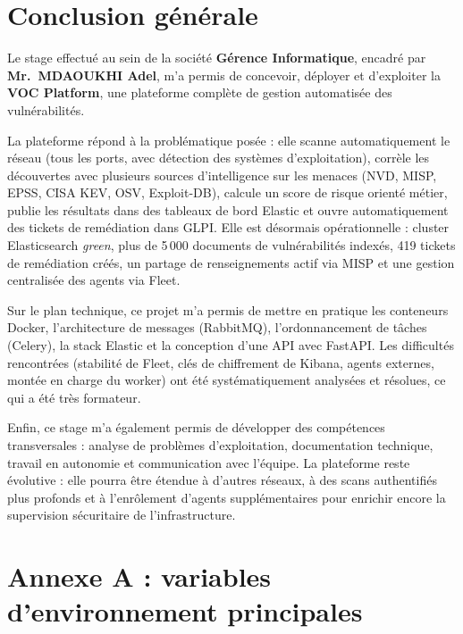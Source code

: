 \documentclass[11pt,a4paper]{article}
\begin{document}
\section{Conclusion g\'en\'erale}

Le stage effectu\'e au sein de la soci\'et\'e \textbf{G\'erence Informatique},
encadr\'e par \textbf{Mr.~MDAOUKHI Adel}, m'a permis de concevoir, d\'eployer
et d'exploiter la \textbf{VOC Platform}, une plateforme compl\`ete de gestion
automatis\'ee des vuln\'erabilit\'es.

La plateforme r\'epond \`a la probl\'ematique pos\'ee : elle scanne
automatiquement le r\'eseau (tous les ports, avec d\'etection des syst\`emes
d'exploitation), corr\`ele les d\'ecouvertes avec plusieurs sources
d'intelligence sur les menaces (NVD, MISP, EPSS, CISA KEV, OSV, Exploit-DB),
calcule un score de risque orient\'e m\'etier, publie les r\'esultats dans des
tableaux de bord Elastic et ouvre automatiquement des tickets de
rem\'ediation dans GLPI. Elle est d\'esormais op\'erationnelle : cluster
Elasticsearch \emph{green}, plus de 5\,000 documents de vuln\'erabilit\'es
index\'es, 419 tickets de rem\'ediation cr\'e\'es, un partage de
renseignements actif via MISP et une gestion centralis\'ee des agents via
Fleet.

Sur le plan technique, ce projet m'a permis de mettre en pratique les
conteneurs Docker, l'architecture de messages (RabbitMQ), l'ordonnancement de
t\^aches (Celery), la stack Elastic et la conception d'une API avec FastAPI.
Les difficult\'es rencontr\'ees (stabilit\'e de Fleet, cl\'es de chiffrement
de Kibana, agents externes, mont\'ee en charge du worker) ont \'et\'e
syst\'ematiquement analys\'ees et r\'esolues, ce qui a \'et\'e tr\`es
formateur.

Enfin, ce stage m'a \'egalement permis de d\'evelopper des comp\'etences
transversales : analyse de probl\`emes d'exploitation, documentation technique,
travail en autonomie et communication avec l'\'equipe. La plateforme reste
\'evolutive : elle pourra \^etre \'etendue \`a d'autres r\'eseaux, \`a des
scans authentifi\'es plus profonds et \`a l'enr\^olement d'agents
suppl\'ementaires pour enrichir encore la supervision s\'ecuritaire de
l'infrastructure.

\clearpage
\appendix

\section{Annexe A : variables d'environnement principales}
\end{document}
